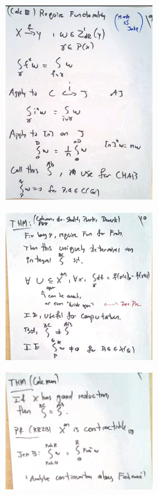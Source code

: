 	\begin{figure}[!ht]
	\centering
	\includegraphics[width=0.5\textwidth]{../images/im42.png}
	\end{figure}

	\begin{figure}[!ht]
	\centering
	\includegraphics[width=0.5\textwidth]{../images/im43.png}
	\end{figure}


	\begin{figure}[!ht]
	\centering
	\includegraphics[width=0.5\textwidth]{../images/im44.png}
	\end{figure}

